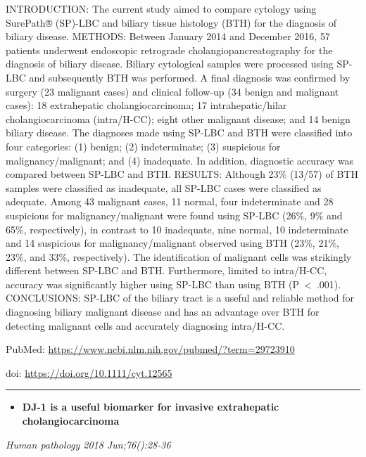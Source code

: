 \documentclass[]{article}
\providecommand{\tightlist}{%
  \setlength{\itemsep}{0pt}\setlength{\parskip}{0pt}}
\begin{document}
INTRODUCTION: The current study aimed to compare cytology using
SurePath® (SP)-LBC and biliary tissue histology (BTH) for the diagnosis
of biliary disease. METHODS: Between January 2014 and December 2016, 57
patients underwent endoscopic retrograde cholangiopancreatography for
the diagnosis of biliary disease. Biliary cytological samples were
processed using SP-LBC and subsequently BTH was performed. A final
diagnosis was confirmed by surgery (23 malignant cases) and clinical
follow-up (34 benign and malignant cases): 18 extrahepatic
cholangiocarcinoma; 17 intrahepatic/hilar cholangiocarcinoma
(intra/H-CC); eight other malignant disease; and 14 benign biliary
disease. The diagnoses made using SP-LBC and BTH were classified into
four categories: (1) benign; (2) indeterminate; (3) suspicious for
malignancy/malignant; and (4) inadequate. In addition, diagnostic
accuracy was compared between SP-LBC and BTH. RESULTS: Although 23\%
(13/57) of BTH samples were classified as inadequate, all SP-LBC cases
were classified as adequate. Among 43 malignant cases, 11 normal, four
indeterminate and 28 suspicious for malignancy/malignant were found
using SP-LBC (26\%, 9\% and 65\%, respectively), in contrast to 10
inadequate, nine normal, 10 indeterminate and 14 suspicious for
malignancy/malignant observed using BTH (23\%, 21\%, 23\%, and 33\%,
respectively). The identification of malignant cells was strikingly
different between SP-LBC and BTH. Furthermore, limited to intra/H-CC,
accuracy was significantly higher using SP-LBC than using BTH
(P~\textless{}~.001). CONCLUSIONS: SP-LBC of the biliary tract is a
useful and reliable method for diagnosing biliary malignant disease and
has an advantage over BTH for detecting malignant cells and accurately
diagnosing intra/H-CC.

PubMed: \url{https://www.ncbi.nlm.nih.gov/pubmed/?term=29723910}

doi: \url{https://doi.org/10.1111/cyt.12565}

{}

{}

\begin{center}\rule{0.5\linewidth}{\linethickness}\end{center}

\begin{itemize}
\tightlist
\item
  \textbf{DJ-1 is a useful biomarker for invasive extrahepatic
  cholangiocarcinoma}
\end{itemize}

\emph{Human pathology 2018 Jun;76():28-36}
\end{document}
